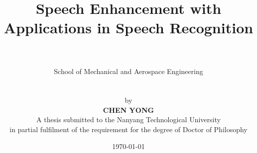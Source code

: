 
\title{\sc
\vspace{-0.5in} Speech Enhancement with Applications in
Speech Recognition \\
\vspace*{0.3in} \centering
{}\\[1em]}

\author{
School of Mechanical and Aerospace Engineering\\
\\
\\[1em]
by\\[1em]
{\rm\bf CHEN YONG}\\[1.5em]
A thesis submitted to the Nanyang Technological University\\
in partial fulfilment of the requirement for the degree of 
Doctor of Philosophy\\[1.5em]
}

\date{\today}
\maketitle
\thispagestyle{empty}        %